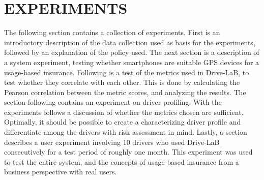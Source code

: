 \section{EXPERIMENTS}\label{sec:experiments}

The following section contains a collection of experiments. First is an introductory description of the data collection used as basis for the experiments, followed by an explanation of the policy used. The next section is a description of a system experiment, testing whether smartphones are suitable GPS devices for a usage-based insurance. Following is a test of the metrics used in Drive-LaB, to test whether they correlate with each other. This is done by calculating the Pearson correlation between the metric scores, and analyzing the results. The section following contains an experiment on driver profiling. With the experiments follows a discussion of whether the metrics chosen are sufficient. Optimally, it should be possible to create a characterizing driver profile and differentiate among the drivers with risk assessment in mind. Lastly, a section describes a user experiment involving 10 drivers who used Drive-LaB consecutively for a test period of roughly one month. This experiment was used to test the entire system, and the concepts of usage-based insurance from a business perspective with real users.



